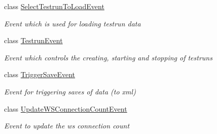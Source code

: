 \begin{DoxyCompactItemize}
class \hyperlink{class_web_analyzer_1_1_events_1_1_select_testrun_to_load_event}{Select\+Testrun\+To\+Load\+Event}
\begin{DoxyCompactList}\small\item\em Event which is used for loading testrun data \end{DoxyCompactList}\item 
class \hyperlink{class_web_analyzer_1_1_events_1_1_testrun_event}{Testrun\+Event}
\begin{DoxyCompactList}\small\item\em Event which controls the creating, starting and stopping of testruns \end{DoxyCompactList}\item 
class \hyperlink{class_web_analyzer_1_1_events_1_1_trigger_save_event}{Trigger\+Save\+Event}
\begin{DoxyCompactList}\small\item\em Event for triggering saves of data (to xml) \end{DoxyCompactList}\item 
class \hyperlink{class_web_analyzer_1_1_events_1_1_update_w_s_connection_count_event}{Update\+W\+S\+Connection\+Count\+Event}
\begin{DoxyCompactList}\small\item\em Event to update the ws connection count \end{DoxyCompactList}\end{DoxyCompactItemize}
